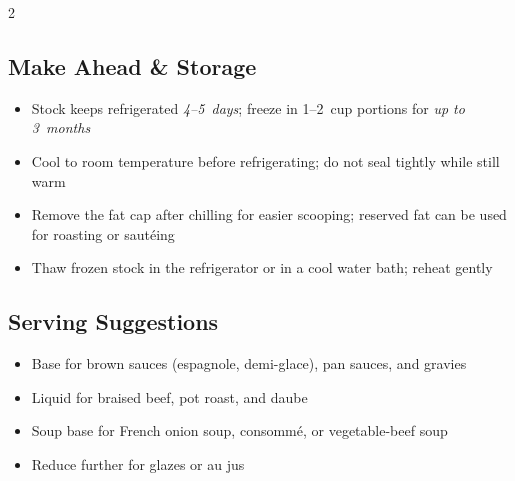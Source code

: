 \documentclass[11pt,letterpaper]{article}
\begin{document}
{\begin{multicols}{2}
\subsection*{Make Ahead \& Storage}
\begin{itemize}
    \item Stock keeps refrigerated \textit{4--5~days}; freeze in 1--2~cup portions for \textit{up to 3~months}
    \item Cool to room temperature before refrigerating; do not seal tightly while still warm
    \item Remove the fat cap after chilling for easier scooping; reserved fat can be used for roasting or sautéing
    \item Thaw frozen stock in the refrigerator or in a cool water bath; reheat gently
\end{itemize}

\subsection*{Serving Suggestions}
\begin{itemize}
    \item Base for brown sauces (espagnole, demi-glace), pan sauces, and gravies
    \item Liquid for braised beef, pot roast, and daube
    \item Soup base for French onion soup, consommé, or vegetable-beef soup
    \item Reduce further for glazes or au jus
\end{itemize}

\end{multicols}
}
\end{document}
